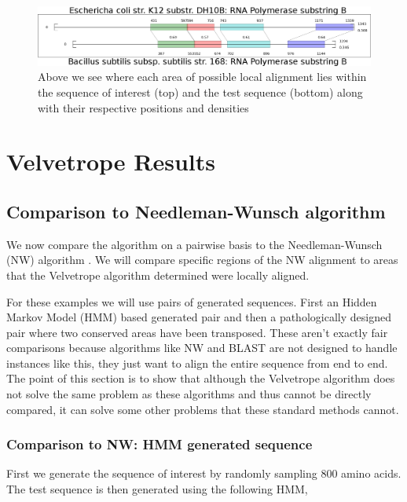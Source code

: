 \documentclass[phd,tocprelim]{cornell}
\begin{document}
 \begin{figure}[htp]%
 \centerline{\includegraphics[width=\textwidth]{figures/velvetrope/localAlignmentsBreakout.png}}
 \caption[Local alignments]{Above we see where each area of possible local alignment lies within the sequence of interest (top) and the test sequence (bottom) along with their respective positions and densities}
 	\label{fig:vr03}
 \end{figure}


\chapter{Velvetrope Results} %
\label{cha:Velvetrope Results}

\section{Comparison to Needleman-Wunsch algorithm}

We now compare the algorithm on a pairwise basis to the Needleman-Wunsch (NW) algorithm \cite{Durbin06} \cite{Needleman70}. We will compare specific regions of the NW alignment to areas that the Velvetrope algorithm determined were locally aligned.

For these examples we will use pairs of generated sequences. First an Hidden Markov Model (HMM) based generated pair and then a pathologically designed pair where two conserved areas have been transposed. These aren't exactly fair comparisons because algorithms like NW and BLAST are not designed to handle instances like this, they just want to align the entire sequence from end to end. The point of this section is to show that although the Velvetrope algorithm does not solve the same problem as these algorithms and thus cannot be directly compared, it can solve some other problems that these standard methods cannot.

\subsection{Comparison to NW: HMM generated sequence}

First we generate the sequence of interest by randomly sampling 800 amino acids. The test sequence is then generated using the following HMM,
\end{document}
